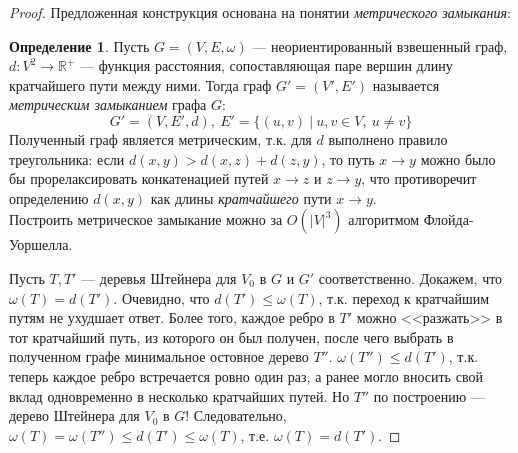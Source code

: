 \documentclass[11pt,a4paper]{report}
\def\Real{\mathbb{R}}
\def\le{\leqslant}
\theoremstyle{definition}
\theoremstyle{definition}
\theoremstyle{definition}
\newtheorem{definition}{Определение}[section]
\begin{document}
		\begin{proof}
			Предложенная конструкция основана на понятии \textit{метрического замыкания}:
			\begin{definition}
				Пусть $ G = (V, E, \omega) $ — неориентированный взвешенный граф, $d: V^2 \to \Real^{+} $ — функция расстояния, сопоставляющая паре вершин длину кратчайшего пути между ними. Тогда граф $G' = (V', E')$ называется \textit{метрическим замыканием} графа $G$:
				$$
					G' = (V, E', d),\ E' = \{ (u, v)\ |\ u, v \in V,\ u \neq v \}
				$$
				Полученный граф является метрическим, т.к. для $d$ выполнено правило треугольника: если $ d(x, y) > d(x, z) + d(z, y) $, то путь $x \to y$ можно было бы прорелаксировать конкатенацией путей $x \to z$ и $z \to y$, что противоречит определению $d(x, y)$ как длины \textit{кратчайшего} пути $x \to y$.\\
				Построить метрическое замыкание можно за $O(|V|^3)$ алгоритмом Флойда-Уоршелла. 
			\end{definition}
			\noindent Пусть $T, T'$ — деревья Штейнера для $V_0$ в $ G $ и $ G' $ соответственно. Докажем, что $\omega(T) = d(T')$. Очевидно, что $ d(T') \le \omega(T) $, т.к. переход к кратчайшим путям не ухудшает ответ. Более того, каждое ребро в $T'$ можно <<разжать>> в тот кратчайший путь, из которого он был получен, после чего выбрать в полученном графе минимальное остовное дерево $T''$. $\omega(T'') \le d(T')$, т.к. теперь каждое ребро встречается ровно один раз, а ранее могло вносить свой вклад одновременно в несколько кратчайших путей. Но $T''$ по построению — дерево Штейнера для $V_0$ в $G$! Следовательно, $ \omega(T) = \omega(T'') \le d(T') \le \omega(T)$, т.е. $\omega(T) = d(T')$.
 		\end{proof}
\end{document}
